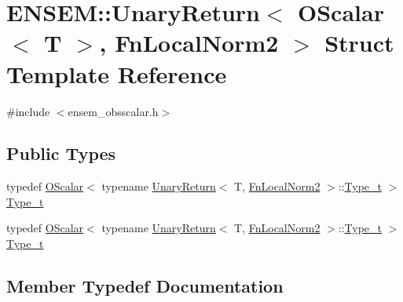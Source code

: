 \hypertarget{structENSEM_1_1UnaryReturn_3_01OScalar_3_01T_01_4_00_01FnLocalNorm2_01_4}{}\section{E\+N\+S\+EM\+:\+:Unary\+Return$<$ O\+Scalar$<$ T $>$, Fn\+Local\+Norm2 $>$ Struct Template Reference}
\label{structENSEM_1_1UnaryReturn_3_01OScalar_3_01T_01_4_00_01FnLocalNorm2_01_4}


{\ttfamily \#include $<$ensem\+\_\+obsscalar.\+h$>$}

\subsection*{Public Types}
\begin{DoxyCompactItemize}
\item 
typedef \mbox{\hyperlink{classENSEM_1_1OScalar}{O\+Scalar}}$<$ typename \mbox{\hyperlink{structENSEM_1_1UnaryReturn}{Unary\+Return}}$<$ T, \mbox{\hyperlink{structENSEM_1_1FnLocalNorm2}{Fn\+Local\+Norm2}} $>$\+::\mbox{\hyperlink{structENSEM_1_1UnaryReturn_3_01OScalar_3_01T_01_4_00_01FnLocalNorm2_01_4_a610bc1debf55f6071875791495bca2a5}{Type\+\_\+t}} $>$ \mbox{\hyperlink{structENSEM_1_1UnaryReturn_3_01OScalar_3_01T_01_4_00_01FnLocalNorm2_01_4_a610bc1debf55f6071875791495bca2a5}{Type\+\_\+t}}
\item 
typedef \mbox{\hyperlink{classENSEM_1_1OScalar}{O\+Scalar}}$<$ typename \mbox{\hyperlink{structENSEM_1_1UnaryReturn}{Unary\+Return}}$<$ T, \mbox{\hyperlink{structENSEM_1_1FnLocalNorm2}{Fn\+Local\+Norm2}} $>$\+::\mbox{\hyperlink{structENSEM_1_1UnaryReturn_3_01OScalar_3_01T_01_4_00_01FnLocalNorm2_01_4_a610bc1debf55f6071875791495bca2a5}{Type\+\_\+t}} $>$ \mbox{\hyperlink{structENSEM_1_1UnaryReturn_3_01OScalar_3_01T_01_4_00_01FnLocalNorm2_01_4_a610bc1debf55f6071875791495bca2a5}{Type\+\_\+t}}
\end{DoxyCompactItemize}


\subsection{Member Typedef Documentation}
\mbox{\label{structENSEM_1_1UnaryReturn_3_01OScalar_3_01T_01_4_00_01FnLocalNorm2_01_4_a610bc1debf55f6071875791495bca2a5}} 
